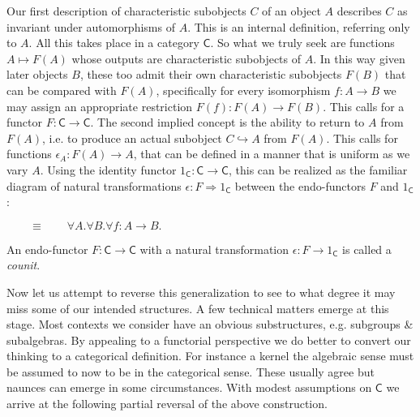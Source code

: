 \documentclass{amsart}
\begin{document}
Our first description of characteristic subobjects $C$ of an object $A$
describes $C$ as invariant under automorphisms of $A$.   This is an internal
definition, referring only to $A$.   All this takes place in a category
$\mathsf{C}$.  So what we truly seek are functions $A\mapsto F(A)$ whose outputs
are characteristic subobjects of $A$.  In this way given later objects $B$,
these too admit their own characteristic subobjects $F(B)$ that can be compared
with $F(A)$, specifically for every isomorphism $f:A\to B$ we may assign an
appropriate restriction $F(f):F(A)\to F(B)$. This calls for a functor
$F:\mathsf{C}\to \mathsf{C}$.  The second implied concept is the ability to
return to $A$ from $F(A)$, i.e. to produce an actual subobject $C\hookrightarrow
A$ from $F(A)$.  This calls for functions $\epsilon_A:F(A)\to A$, that can be
defined in a manner that is uniform as we vary $A$.  Using the identity functor
$1_{\mathsf{C}}:\mathsf{C}\to \mathsf{C}$, this can be realized as the familiar
diagram of natural transformations $\epsilon:F\Rightarrow 1_{\mathsf{C}}$ between
the endo-functors $F$ and $1_{\mathsf{C}}$:
\begin{center}
    $\qquad \equiv\qquad \forall A.\forall B.\forall f:A\to B.\qquad$
\end{center}
An endo-functor $F:\mathsf{C}\to \mathsf{C}$ with a natural transformation 
$\epsilon:F\to 1_{\mathsf{C}}$ is called a \emph{counit}.


Now let us attempt to reverse this generalization to see to what degree it may
miss some of our intended structures.  A few technical matters emerge at this
stage.  Most contexts we consider have an obvious substructures, e.g. subgroups
\& subalgebras.  By appealing to a functorial perspective we do better to
convert our thinking to a categorical definition.  For instance a kernel the
algebraic sense must be assumed to now to be in the categorical sense.  These
usually agree but naunces can emerge in some circumstances.  With modest
assumptions on $\mathsf{C}$ we arrive at the following partial reversal of the
above construction.
\end{document}
